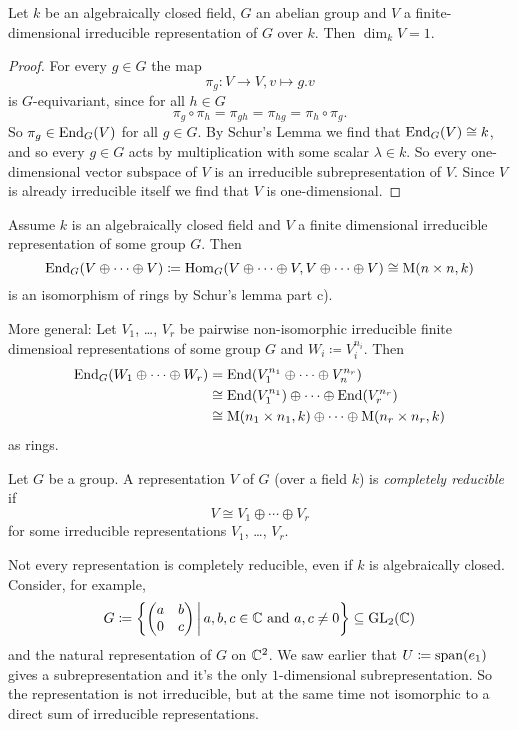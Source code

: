 \begin{cor}
  Let $k$ be an algebraically closed field, $G$ an abelian group and $V$ a finite-dimensional irreducible representation of $G$ over $k$. Then $\dim_k V = 1$.
\end{cor}
\begin{proof}
  For every $g \in G$ the map
  \[
    \pi_g \colon V \to V, v \mapsto g.v
  \]
  is $G$-equivariant, since for all $h \in G$
  \[
    \pi_g \circ \pi_h = \pi_{gh} = \pi_{hg} = \pi_h \circ \pi_g.
  \]
  So $\pi_g \in \operatorname{End}_G(V)$ for all $g \in G$. By Schur’s Lemma we find that $\operatorname{End}_G(V) \cong k$, and so every $g \in G$ acts by multiplication with some scalar $\lambda \in k$. So every one-dimensional vector subspace of $V$ is an irreducible subrepresentation of $V$. Since $V$ is already irreducible itself we find that $V$ is one-dimensional.
\end{proof}


\begin{rem}
  Assume $k$ is an algebraically closed field and $V$ a finite dimensional irreducible representation of some group $G$. Then
  \[
    \operatorname{End}_G(V \oplus \dotsb \oplus V)
    \coloneqq \operatorname{Hom}_G(V \oplus \dotsb \oplus V, V \oplus \dotsb \oplus V)
    \cong \operatorname{M}(n \times n, k)
  \]
  is an isomorphism of rings by Schur’s lemma part c).
  
  More general: Let $V_1$, \dots, $V_r$ be pairwise non-isomorphic irreducible finite dimensioal representations of some group $G$ and $W_i \coloneqq V_i^{n_i}$. Then
  \begin{align*}
    \operatorname{End}_G(W_1 \oplus \dotsb \oplus W_r)
    &= \operatorname{End}(V_1^{n_1} \oplus \dotsb \oplus V_n^{n_r}) \\
    &\cong \operatorname{End}(V_1^{n_1}) \oplus \dotsb \oplus \operatorname{End}(V_r^{n_r}) \\
    &\cong \operatorname{M}(n_1 \times n_1, k) \oplus \dotsb \oplus \operatorname{M}(n_r \times n_r, k)
  \end{align*}
  as rings.
\end{rem}


\begin{defi}
  Let $G$ be a group. A representation $V$ of $G$ (over a field $k$) is \emph{completely reducible} if
  \[
    V \cong V_1 \oplus \dotsb \oplus V_r
  \]
  for some irreducible representations $V_1$, \dots, $V_r$.
\end{defi}


\begin{rem}
  Not every representation is completely reducible, even if $k$ is algebraically closed. Consider, for example,
  \[
    G \coloneqq \left\{\begin{pmatrix}a & b \\ 0 & c\end{pmatrix} \,\middle|\, a,b,c \in \mathbb{C} \text{ and } a,c \neq 0\right\}
    \subseteq \operatorname{GL}_2(\mathbb{C})
  \]
  and the natural representation of $G$ on $\mathbb{C}^2$. We saw earlier that $U \coloneqq \operatorname{span}(e_1)$ gives a subrepresentation and it’s the only $1$-dimensional subrepresentation. So the representation is not irreducible, but at the same time not isomorphic to a direct sum of irreducible representations.
\end{rem}


